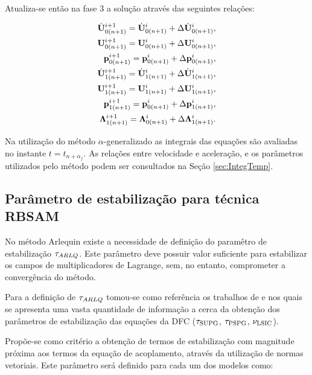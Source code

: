 \documentclass[tese_patricia]{subfiles}
\begin{document}
Atualiza-se então na fase 3 a solução através das seguintes relações:

\begin{align}
	\dot{\mathbf{U}}_{0(n+1)}^{i+1} = \dot{\mathbf{U}}_{0(n+1)}^{i} + \Delta\dot{\mathbf{U}}_{0(n+1)}^{i}, \label{eq:up1} \\ 
	\mathbf{U}_{0(n+1)}^{i+1} = \mathbf{U}_{0(n+1)}^{i} + \Delta\mathbf{U}_{0(n+1)}^{i},\label{eq:up2}\\
	\mathbf{p}_{0(n+1)}^{i+1} = \mathbf{p}_{0(n+1)}^{i} + \Delta\mathbf{p}_{0(n+1)}^{i}, \label{eq:up3} \\
	\dot{\mathbf{U}}_{1(n+1)}^{i+1} = \dot{\mathbf{U}}_{1(n+1)}^{i} + \Delta\dot{\mathbf{U}}_{1(n+1)}^{i}, \label{eq:up4} \\ 
	\mathbf{U}_{1(n+1)}^{i+1} = \mathbf{U}_{1(n+1)}^{i} + \Delta\mathbf{U}_{1(n+1)}^{i},\label{eq:up5}\\
	\mathbf{p}_{1(n+1)}^{i+1} = \mathbf{p}_{0(n+1)}^{i} + \Delta\mathbf{p}_{1(n+1)}^{i}, \label{eq:up6} \\
	\boldsymbol{\Lambda}_{1(n+1)}^{i+1} = \boldsymbol{\Lambda}_{0(n+1)}^{i} + \Delta\boldsymbol{\Lambda}_{1(n+1)}^{i}. \label{eq:up7}
\end{align}

Na utilização do método $\alpha$-generalizado as integrais das equações são avaliadas no instante $t = t_{n+\alpha_{f}}$. As relações entre velocidade e aceleração, e os parâmetros utilizados pelo método podem ser consultados na Seção \ref{sec:IntegTemp}.


\subsection{Parâmetro de estabilização para técnica RBSAM}

No método Arlequin existe a necessidade de definição do paramêtro de estabilização $\tau_{ARLQ}$. Este parâmetro deve possuir valor suficiente para estabilizar os campos de multiplicadores de Lagrange, sem, no entanto, comprometer a convergência do método. 

Para a definição de $\tau_{ARLQ}$ tomou-se como referência os trabalhos de  e  nos quais se apresenta uma vasta quantidade de informação a cerca da obtenção dos parâmetros de estabilização das equações da DFC ($\tau_{\mathrm{SUPG}}$, $\tau_{\mathrm{PSPG}}$, $\nu_{\mathrm{LSIC}}$). 
 
Propõe-se como critério a obtenção de termos de estabilização com magnitude próxima aos termos da equação de acoplamento, através da utilização de normas vetoriais. Este parâmetro será definido para cada um dos modelos como:
\end{document}
